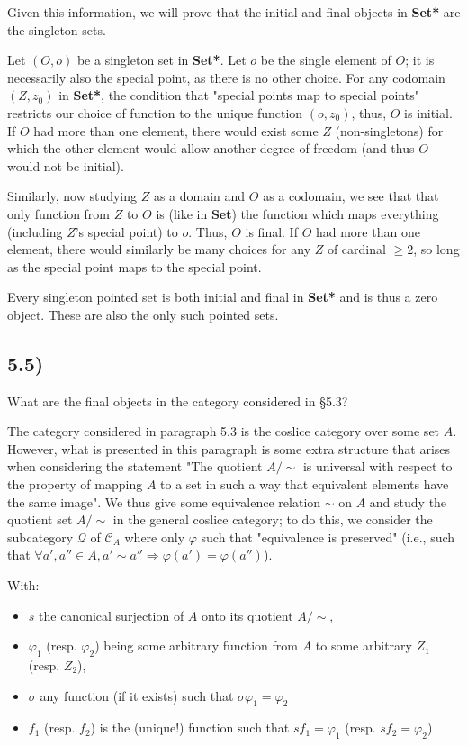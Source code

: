 Given this information, we will prove that the initial and final objects in \textbf{Set*} are the singleton sets.

Let $(O, o)$ be a singleton set in \textbf{Set*}. Let $o$ be the single element of $O$; it is necessarily also the special point, as there is no other choice. For any codomain $(Z, z_0)$ in \textbf{Set*}, the condition that "special points map to special points" restricts our choice of function to the unique function ${(o, z_0)}$, thus, $O$ is initial. If $O$ had more than one element, there would exist some $Z$ (non-singletons) for which the other element would allow another degree of freedom (and thus $O$ would not be initial).

Similarly, now studying $Z$ as a domain and $O$ as a codomain, we see that that only function from $Z$ to $O$ is (like in \textbf{Set}) the function which maps everything (including $Z$'s special point) to $o$. Thus, $O$ is final. If $O$ had more than one element, there would similarly be many choices for any $Z$ of cardinal $\geq 2$, so long as the special point maps to the special point.

Every singleton pointed set is both initial and final in \textbf{Set*} and is thus a zero object. These are also the only such pointed sets.



\subsection*{5.5)}

What are the final objects in the category considered in §5.3?

The category considered in paragraph 5.3 is the coslice category over some set $A$. However, what is presented in this paragraph is some extra structure that arises when considering the statement "The quotient $A/\sim$ is universal with respect to the property of mapping $A$ to a set in such a way that equivalent elements have the same image". We thus give some equivalence relation $\sim$ on $A$ and study the quotient set $A/\sim$ in the general coslice category; to do this, we consider the subcategory $\mathcal{Q}$ of $\mathcal{C}_A$ where only $\varphi$ such that "equivalence is preserved" (i.e., such that $\forall a', a'' \in A, a' \sim a'' \Rightarrow \varphi(a') = \varphi(a'')$).

With:
\begin{itemize}
	\item $s$ the canonical surjection of $A$ onto its quotient $A/\sim$,
	\item $\varphi_1$ (resp. $\varphi_2$) being some arbitrary function from $A$ to some arbitrary $Z_1$ (resp. $Z_2$),
	\item $\sigma$ any function (if it exists) such that $\sigma \varphi_1 = \varphi_2$
	\item $f_1$ (resp. $f_2$) is the (unique!) function such that $s f_1 = \varphi_1$ (resp. $s f_2 = \varphi_2$)
\end{itemize}

